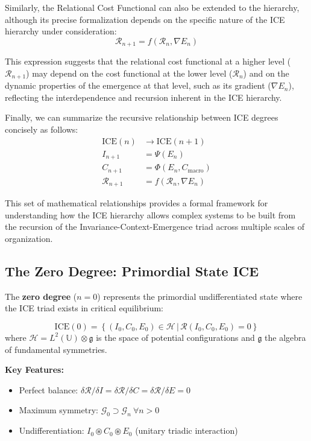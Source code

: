\documentclass{article}
\begin{document}
Similarly, the Relational Cost Functional can also be extended to the hierarchy, although its precise formalization depends on the specific nature of the ICE hierarchy under consideration:
\begin{equation*}
    \mathcal{R}_{n+1} = f(\mathcal{R}_n, \nabla E_n)
\end{equation*}

This expression suggests that the relational cost functional at a higher level ($\mathcal{R}_{n+1}$) may depend on the cost functional at the lower level ($\mathcal{R}_n$) and on the dynamic properties of the emergence at that level, such as its gradient ($\nabla E_n$), reflecting the interdependence and recursion inherent in the ICE hierarchy.

Finally, we can summarize the recursive relationship between ICE degrees concisely as follows:
\begin{align*}
\text{ICE}(n) &\longrightarrow \text{ICE}(n+1) \\
I_{n+1} &= \Psi(E_n) \\
C_{n+1} &= \Phi(E_n, C_{\text{macro}}) \\
\mathcal{R}_{n+1} &= f(\mathcal{R}_n, \nabla E_n)
\end{align*}

This set of mathematical relationships provides a formal framework for understanding how the ICE hierarchy allows complex systems to be built from the recursion of the Invariance-Context-Emergence triad across multiple scales of organization.

\subsection{The Zero Degree: Primordial State ICE}\label{subsec:grado_cero}

The \textbf{zero degree} ($n=0$) represents the primordial undifferentiated state where the ICE triad exists in critical equilibrium:

\begin{equation}
\text{ICE}(0) = \left\{ (I_0, C_0, E_0) \in \mathcal{H} \,|\, \mathcal{R}(I_0,C_0,E_0) = 0 \right\}
\end{equation}
where $\mathcal{H} = L^2(\mathbb{U}) \otimes \mathfrak{g}$ is the space of potential configurations and $\mathfrak{g}$ the algebra of fundamental symmetries.

\noindent\textbf{Key Features:}
\begin{itemize}
\item Perfect balance: $\delta\mathcal{R}/\delta I = \delta\mathcal{R}/\delta C = \delta\mathcal{R}/\delta E = 0$
\item Maximum symmetry: $\mathcal{G}_0 \supset \mathcal{G}_n\ \forall n > 0$
\item Undifferentiation: $I_0 \circledast C_0 \circledast E_0$ (unitary triadic interaction)
\end{itemize}
\end{document}
